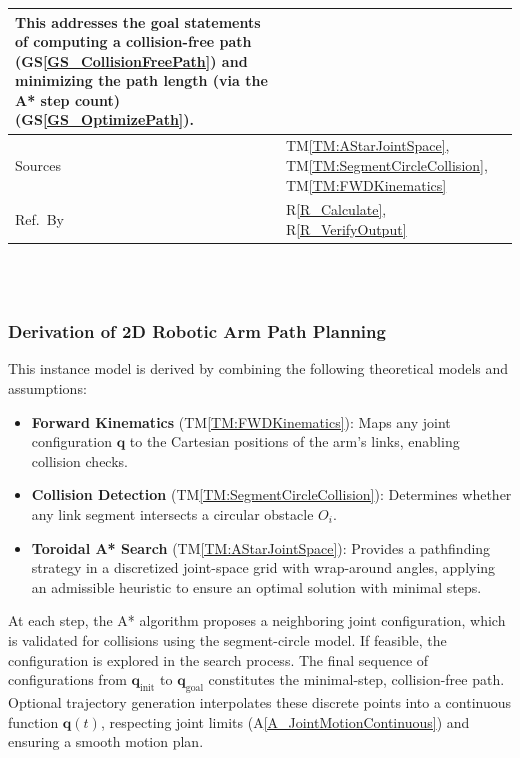 \documentclass[12pt]{article}
\newcommand{\colAwidth}{0.13\textwidth}
\newcommand{\colBwidth}{0.82\textwidth}
\newcommand{\tref}[1]{TM\ref{#1}}
\newcommand{\aref}[1]{A\ref{#1}}
\newcommand{\gsref}[1]{GS\ref{#1}}
\newcommand{\rref}[1]{R\ref{#1}}
\begin{document}
\begin{minipage}{\textwidth}
\begin{tabular}{| p{\colAwidth} | p{\colBwidth}|}
  This addresses the goal statements of computing a collision-free path 
  (\gsref{GS_CollisionFreePath}) and minimizing the path length (via the A* step count) 
  (\gsref{GS_OptimizePath}).
  \\
  \hline
  Sources
  &
  \tref{TM:AStarJointSpace}, \tref{TM:SegmentCircleCollision}, \tref{TM:FWDKinematics}
  \\
  \hline
  Ref.\ By 
  &
  \rref{R_Calculate}, \rref{R_VerifyOutput}
  \\
  \hline
\end{tabular}
\end{minipage}\\

~\newline

\subsubsection*{Derivation of 2D Robotic Arm Path Planning}

This instance model is derived by combining the following theoretical models and assumptions:

\begin{itemize}
    \item \textbf{Forward Kinematics} (\tref{TM:FWDKinematics}): Maps any joint configuration $\mathbf{q}$ to the Cartesian positions of the arm’s links, enabling collision checks.
    \item \textbf{Collision Detection} (\tref{TM:SegmentCircleCollision}): Determines whether any link segment intersects a circular obstacle $O_i$.
    \item \textbf{Toroidal A* Search} (\tref{TM:AStarJointSpace}): Provides a pathfinding strategy in a discretized joint-space grid with wrap-around angles, applying an admissible heuristic to ensure an optimal solution with minimal steps.
\end{itemize}

At each step, the A* algorithm proposes a neighboring joint configuration, which is validated for collisions using the segment-circle model. If feasible, the configuration is explored in the search process. The final sequence of configurations from $\mathbf{q}_{\text{init}}$ to $\mathbf{q}_{\text{goal}}$ constitutes the minimal-step, collision-free path. Optional trajectory generation interpolates these discrete points into a continuous function $\mathbf{q}(t)$, respecting joint limits (\aref{A_JointMotionContinuous}) and ensuring a smooth motion plan.
\end{document}
